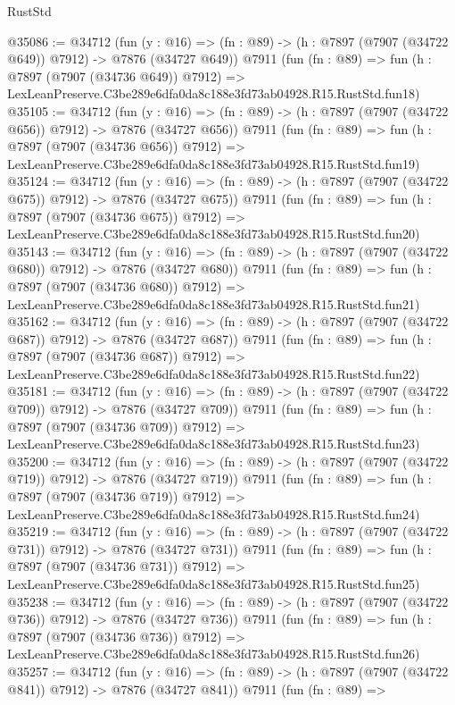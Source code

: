 \begin{lexlean}{RustStd}
\begin{coremodule}
@35086 := @34712
    (fun (y : @16) => (fn : @89) -> (h : @7897 (@7907 (@34722 @649)) @7912) -> @7876 (@34727 @649))
    @7911
    (fun (fn : @89) =>
    fun (h : @7897 (@7907 (@34736 @649)) @7912) =>
    LexLeanPreserve.C3be289e6dfa0da8c188e3fd73ab04928.R15.RustStd.fun18)
@35105 := @34712
    (fun (y : @16) => (fn : @89) -> (h : @7897 (@7907 (@34722 @656)) @7912) -> @7876 (@34727 @656))
    @7911
    (fun (fn : @89) =>
    fun (h : @7897 (@7907 (@34736 @656)) @7912) =>
    LexLeanPreserve.C3be289e6dfa0da8c188e3fd73ab04928.R15.RustStd.fun19)
@35124 := @34712
    (fun (y : @16) => (fn : @89) -> (h : @7897 (@7907 (@34722 @675)) @7912) -> @7876 (@34727 @675))
    @7911
    (fun (fn : @89) =>
    fun (h : @7897 (@7907 (@34736 @675)) @7912) =>
    LexLeanPreserve.C3be289e6dfa0da8c188e3fd73ab04928.R15.RustStd.fun20)
@35143 := @34712
    (fun (y : @16) => (fn : @89) -> (h : @7897 (@7907 (@34722 @680)) @7912) -> @7876 (@34727 @680))
    @7911
    (fun (fn : @89) =>
    fun (h : @7897 (@7907 (@34736 @680)) @7912) =>
    LexLeanPreserve.C3be289e6dfa0da8c188e3fd73ab04928.R15.RustStd.fun21)
@35162 := @34712
    (fun (y : @16) => (fn : @89) -> (h : @7897 (@7907 (@34722 @687)) @7912) -> @7876 (@34727 @687))
    @7911
    (fun (fn : @89) =>
    fun (h : @7897 (@7907 (@34736 @687)) @7912) =>
    LexLeanPreserve.C3be289e6dfa0da8c188e3fd73ab04928.R15.RustStd.fun22)
@35181 := @34712
    (fun (y : @16) => (fn : @89) -> (h : @7897 (@7907 (@34722 @709)) @7912) -> @7876 (@34727 @709))
    @7911
    (fun (fn : @89) =>
    fun (h : @7897 (@7907 (@34736 @709)) @7912) =>
    LexLeanPreserve.C3be289e6dfa0da8c188e3fd73ab04928.R15.RustStd.fun23)
@35200 := @34712
    (fun (y : @16) => (fn : @89) -> (h : @7897 (@7907 (@34722 @719)) @7912) -> @7876 (@34727 @719))
    @7911
    (fun (fn : @89) =>
    fun (h : @7897 (@7907 (@34736 @719)) @7912) =>
    LexLeanPreserve.C3be289e6dfa0da8c188e3fd73ab04928.R15.RustStd.fun24)
@35219 := @34712
    (fun (y : @16) => (fn : @89) -> (h : @7897 (@7907 (@34722 @731)) @7912) -> @7876 (@34727 @731))
    @7911
    (fun (fn : @89) =>
    fun (h : @7897 (@7907 (@34736 @731)) @7912) =>
    LexLeanPreserve.C3be289e6dfa0da8c188e3fd73ab04928.R15.RustStd.fun25)
@35238 := @34712
    (fun (y : @16) => (fn : @89) -> (h : @7897 (@7907 (@34722 @736)) @7912) -> @7876 (@34727 @736))
    @7911
    (fun (fn : @89) =>
    fun (h : @7897 (@7907 (@34736 @736)) @7912) =>
    LexLeanPreserve.C3be289e6dfa0da8c188e3fd73ab04928.R15.RustStd.fun26)
@35257 := @34712
    (fun (y : @16) => (fn : @89) -> (h : @7897 (@7907 (@34722 @841)) @7912) -> @7876 (@34727 @841))
    @7911
    (fun (fn : @89) =>

\end{coremodule}
\end{lexlean}
